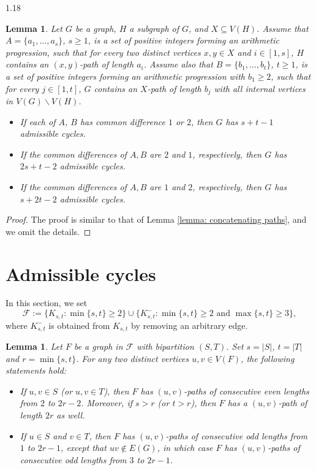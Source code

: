 \documentclass[10pt]{article}
\newtheorem{lemma}[theorem]{Lemma}
\begin{document}
\begin{spacing}{1.18}
\begin{lemma}\label{lemma: concatenating paths X}
    Let $G$ be a graph, $H$ a subgraph of $G$, and $X\subseteq V(H)$. Assume that $A=\{a_1,\ldots,a_s\}$, $s\geqslant 1$, is a set of positive integers forming an arithmetic progression, such that for every two distinct vertices $x,y\in X$ and $i\in[1,s]$, $H$ contains an $(x,y)$-path of length $a_i$. Assume also that $B=\{b_1,\ldots,b_t\}$, $t\geqslant 1$, is a set of positive integers forming an arithmetic progression with $b_1\geqslant 2$, such that for every $j\in [1,t]$, $G$ contains an $X$-path of length $b_j$ with all internal vertices in $V(G)\backslash V(H)$. 
    \begin{itemize}
        \item[(1)] If each of $A$, $B$ has common difference $1$ or $2$, then $G$ has $s+t-1$ admissible cycles.
        \item[(2)] If the common differences of $A,B$ are $2$ and $1$, respectively, then $G$ has $2s+t-2$ admissible cycles.
        \item[(3)] If the common differences of $A,B$ are $1$ and $2$, respectively, then $G$ has $s+2t-2$ admissible cycles.
    \end{itemize}
\end{lemma}

\begin{proof}
    The proof is similar to that of Lemma \ref{lemma: concatenating paths}, and we omit the details.
\end{proof}

\section{Admissible cycles}\label{section: adm cycles}

   In this section, we set 
   \[ 
      \mathcal{F}:=\{K_{s,t}: \min\{s,t\}\geqslant2\}\cup \{K_{s,t}^-: \min\{s,t\}\geqslant2\text{ and }\max\{s,t\}\geqslant3\}, 
   \]
   where $K_{s,t}^-$ is obtained from $K_{s,t}$ by removing an arbitrary edge. 

\begin{lemma}\label{lemma: s-con-odd-paths}
    Let $F$ be a graph in $\mathcal{F}$ with bipartition $(S,T)$. Set $s=|S|$, $t=|T|$ and $r=\min\{s,t\}$. For any two distinct vertices $u,v\in V(F)$, the following statements hold: 
    \begin{itemize}
        \item[(1)] If $u,v\in S$ (or $u,v\in T$), then $F$ has $(u,v)$-paths of consecutive even lengths from $2$ to $2r-2$. Moreover, if $s>r$ (or $t>r$), then $F$ has a $(u,v)$-path of length $2r$ as well.
        \item[(2)] If $u\in S$ and $v\in T$, then $F$ has $(u,v)$-paths of consecutive odd lengths from $1$ to $2r-1$, except that $uv\notin E(G)$, in which case $F$ has $(u,v)$-paths of consecutive odd lengths from $3$ to $2r-1$.
    \end{itemize}
\end{lemma}


\end{spacing}
\end{document}
